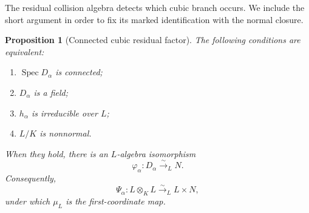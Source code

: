 \documentclass[11pt]{article}
\newtheorem{proposition}[theorem]{Proposition}
\theoremstyle{remark}
\DeclareMathOperator{\Spec}{Spec}
\begin{document}
The residual collision algebra detects which cubic branch occurs.  We
include the short argument in order to fix its marked identification with
the normal closure.

\begin{proposition}[Connected cubic residual factor]
\label{prop:cubic-tensor-decomposition}
The following conditions are equivalent:
\begin{enumerate}[label=\textup{(\roman*)}]
  \item \(\Spec D_\alpha\) is connected;
  \item \(D_\alpha\) is a field;
  \item \(h_\alpha\) is irreducible over \(L\);
  \item \(L/K\) is nonnormal.
\end{enumerate}
When they hold, there is an \(L\)-algebra isomorphism
\[
  \varphi_\alpha\colon D_\alpha\xrightarrow{\sim}_L N.
\]
Consequently,
\[
  \Psi_\alpha\colon L\otimes_KL\xrightarrow{\sim}_L L\times N,
\]
under which \(\mu_L\) is the first-coordinate map.
\end{proposition}
\end{document}
